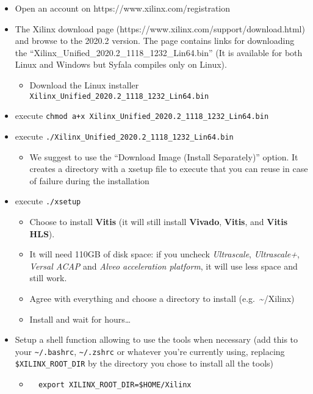 \begin{itemize}
\item
  Open an account on https://www.xilinx.com/registration
\item
  The Xilinx download page
  (https://www.xilinx.com/support/download.html) and browse to the
  2020.2 version. The page contains links for downloading the
  ``Xilinx\_Unified\_2020.2\_1118\_1232\_Lin64.bin'' (It is available
  for both Linux and Windows but Syfala compiles only on Linux).

  \begin{itemize}
  \item
    Download the Linux installer
    \texttt{Xilinx\_Unified\_2020.2\_1118\_1232\_Lin64.bin}
  \end{itemize}
\item
  execute
  \texttt{chmod\ a+x\ Xilinx\_Unified\_2020.2\_1118\_1232\_Lin64.bin}
\item
  execute \texttt{./Xilinx\_Unified\_2020.2\_1118\_1232\_Lin64.bin}

  \begin{itemize}
  \item
    We suggest to use the ``Download Image (Install Separately)''
    option. It creates a directory with a xsetup file to execute that
    you can reuse in case of failure during the installation
  \end{itemize}
\item
  execute \texttt{./xsetup}

  \begin{itemize}
  \item
    Choose to install \textbf{Vitis} (it will still install
    \textbf{Vivado}, \textbf{Vitis}, and \textbf{Vitis HLS}).
  \item
    It will need 110GB of disk space: if you uncheck \emph{Ultrascale},
    \emph{Ultrascale+}, \emph{Versal ACAP} and \emph{Alveo acceleration
    platform}, it will use less space and still work.
  \item
    Agree with everything and choose a directory to install
    (e.g.~\textasciitilde/Xilinx)
  \item
    Install and wait for hours\ldots{}
  \end{itemize}
\item
  Setup a shell function allowing to use the tools when necessary (add
  this to your \texttt{\textasciitilde{}/.bashrc},
  \texttt{\textasciitilde{}/.zshrc} or whatever you're currently using,
  replacing \texttt{\$XILINX\_ROOT\_DIR} by the directory you chose to
  install all the tools)

  \begin{itemize}
  \item
\begin{verbatim}
  export XILINX_ROOT_DIR=$HOME/Xilinx
\end{verbatim}
  \end{itemize}
\end{itemize}

